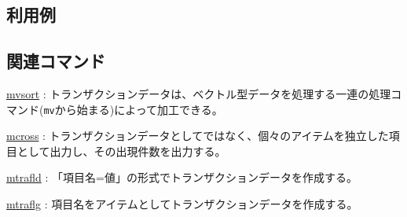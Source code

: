 \subsection*{利用例}

\subsection*{関連コマンド}
\hyperref[sect:mvsort]{mvsort} : トランザクションデータは、ベクトル型データを処理する一連の処理コマンド(\verb|mv|から始まる)によって加工できる。

\hyperref[sect:mcross]{mcross} : トランザクションデータとしてではなく、個々のアイテムを独立した項目として出力し、その出現件数を出力する。

\hyperref[sect:mtrafld]{mtrafld} : 「項目名=値」の形式でトランザクションデータを作成する。

\hyperref[sect:mtraflg]{mtraflg} : 項目名をアイテムとしてトランザクションデータを作成する。

%
